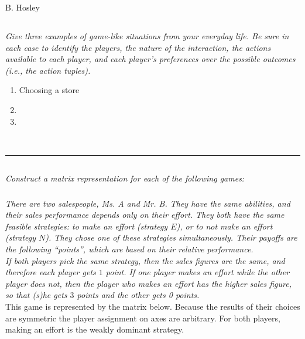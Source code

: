 \documentclass[12pt]{amsart}
\begin{document}
\raggedbottom

\hspace{\fill} {\large B. Hosley}
\bigskip


\subsection{}
\emph{ Give three examples of game-like situations from your everyday life. Be sure in each case to
	identify the players, the nature of the interaction, the actions available to each player, and
	each player’s preferences over the possible outcomes (i.e., the action tuples).}

\begin{enumerate}
	\item Choosing a store
	\item 
	\item 
\end{enumerate}

\phantom{} \\
\hrule

\subsection{}
\emph{Construct a matrix representation for each of the following games:}

\subsubsection{}
\emph{There are two salespeople, Ms. A and Mr. B. They have the same abilities, and their
	sales performance depends only on their effort. They both have the same feasible
	strategies: to make an effort (strategy $E$), or to not make an effort (strategy $N$). They
	chose one of these strategies simultaneously. Their payoffs are the following “points”,
	which are based on their relative performance. \\
	If both players pick the same strategy, then the sales figures are the same, and
	therefore each player gets $1$ point. If one player makes an effort while the other player
	does not, then the player who makes an effort has the higher sales figure, so that (s)he
	gets $3$ points and the other gets 0 points.}\\
	

	This game is represented by the matrix below. Because the results of their choices are 
	symmetric the player assignment on axes are arbitrary. 
	For both players, making an effort is the weakly dominant strategy. \\ 
	
\end{document}
